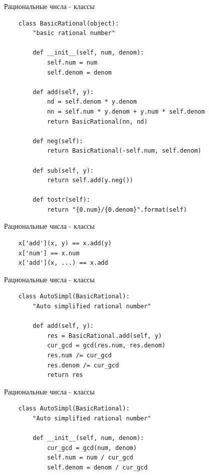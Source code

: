 \documentclass{article}
\begin{document}
\begin{center} Рациональные числа - классы \end{center}
\begin{lstlisting}
    class BasicRational(object):
        "basic rational number"

        def __init__(self, num, denom):
            self.num = num
            self.denom = denom

        def add(self, y):
            nd = self.denom * y.denom
            nn = self.num * y.denom + y.num * self.denom
            return BasicRational(nn, nd)

        def neg(self):
            return BasicRational(-self.num, self.denom)

        def sub(self, y):
            return self.add(y.neg())

        def tostr(self):
            return "{0.num}/{0.denom}".format(self)
\end{lstlisting}
\newpage

\begin{center} Рациональные числа - классы \end{center}
\begin{lstlisting}
    x['add'](x, y) == x.add(y)
    x['num'] == x.num
    x['add'](x, ...) == x.add
\end{lstlisting}
\newpage

\begin{center} Рациональные числа - классы \end{center}
\begin{lstlisting}
    class AutoSimpl(BasicRational):
        "Auto simplified rational number"

        def add(self, y):
            res = BasicRational.add(self, y)
            cur_gcd = gcd(res.num, res.denom)
            res.num /= cur_gcd
            res.denom /= cur_gcd
            return res
\end{lstlisting}
\newpage

\begin{center} Рациональные числа - классы \end{center}
\begin{lstlisting}
    class AutoSimpl(BasicRational):
        "Auto simplified rational number"
    
        def __init__(self, num, denom):
            cur_gcd = gcd(num, denom)
            self.num = num / cur_gcd
            self.denom = denom / cur_gcd
\end{lstlisting}
\newpage
\end{document}
